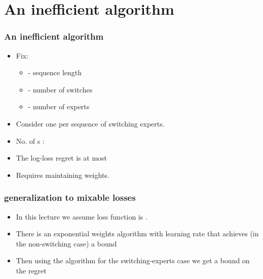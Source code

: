 \documentclass[handout]{beamer}
\begin{document}
\section{An inefficient algorithm}

\begin{frame}
\frametitle{An inefficient algorithm}
\begin{itemize}
\item Fix:
\begin{itemize}
\item {} - sequence length
\item {} - number of switches
\item {} - number of experts
\end{itemize}
\item Consider one  per sequence of switching experts.
\item No. of s : 
\item The log-loss regret is at most 
\item Requires maintaining  weights.
\end{itemize}
\end{frame}

\begin{frame}
\frametitle{generalization to mixable losses}
\begin{itemize}
\item In this lecture we assume loss function is .
\item There is an exponential weights algorithm with learning rate \R{$\eta$} that 
achieves (in the non-switching case) a bound 
\item Then using the  algorithm for the switching-experts case 
we get a bound on the regret 
\end{itemize}
\end{frame}
\end{document}
